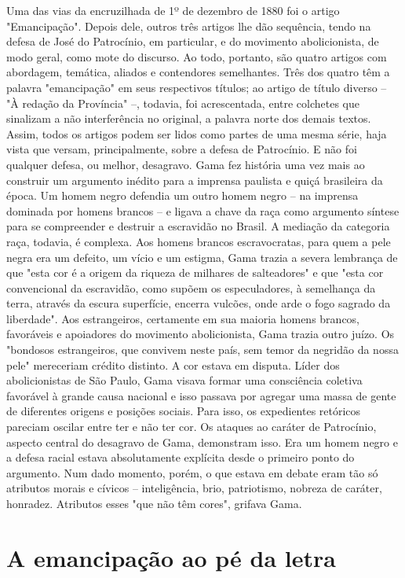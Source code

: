 {\small\noindent
Uma das vias da encruzilhada de 1º de dezembro de 1880 foi o
artigo "Emancipação". Depois dele, outros três artigos lhe dão
sequência, tendo na defesa de José do Patrocínio, em particular, e do
movimento abolicionista, de modo geral, como mote do discurso. Ao todo,
portanto, são quatro artigos com abordagem, temática, aliados e
contendores semelhantes. Três dos quatro têm a palavra "emancipação" em
seus respectivos títulos; ao artigo de título diverso -- "À redação da
Província" --, todavia, foi acrescentada, entre colchetes que sinalizam
a não interferência no original, a palavra norte dos demais textos.
Assim, todos os artigos podem ser lidos como partes de uma mesma série,
haja vista que versam, principalmente, sobre a defesa de Patrocínio. E
não foi qualquer defesa, ou melhor, desagravo. Gama fez história uma vez
mais ao construir um argumento inédito para a imprensa paulista e quiçá
brasileira da época. Um homem negro defendia um outro homem negro -- na
imprensa dominada por homens brancos -- e ligava a chave da raça como
argumento síntese para se compreender e destruir a escravidão no Brasil.
A mediação da categoria raça, todavia, é complexa. Aos homens brancos
escravocratas, para quem a pele negra era um defeito, um vício e um
estigma, Gama trazia a severa lembrança de que "esta cor é a origem da
riqueza de milhares de salteadores" e que "esta cor convencional da
escravidão, como supõem os especuladores, à semelhança da terra, através
da escura superfície, encerra vulcões, onde arde o fogo sagrado da
liberdade". Aos estrangeiros, certamente em sua maioria homens brancos,
favoráveis e apoiadores do movimento abolicionista, Gama trazia outro
juízo. Os "bondosos estrangeiros, que convivem neste país, sem temor da
negridão da nossa pele" mereceriam crédito distinto. A cor estava em
disputa. Líder dos abolicionistas de São Paulo, Gama visava formar uma
consciência coletiva favorável à grande causa nacional e isso passava
por agregar uma massa de gente de diferentes origens e posições sociais.
Para isso, os expedientes retóricos pareciam oscilar entre ter e não ter
cor. Os ataques ao caráter de Patrocínio, aspecto central do desagravo
de Gama, demonstram isso. Era um homem negro e a defesa racial estava
absolutamente explícita desde o primeiro ponto do argumento. Num dado
momento, porém, o que estava em debate eram tão só atributos morais e
cívicos -- inteligência, brio, patriotismo, nobreza de caráter,
honradez. Atributos esses "que não têm cores", grifava Gama.}

\part{A emancipação ao pé da letra}

